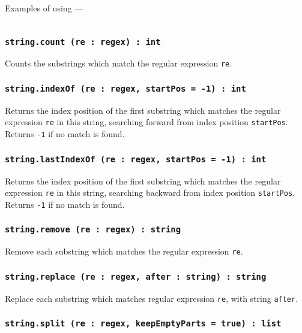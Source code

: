 Examples of using —
\inputminted[linenos]{icl}{../sources/regexplikearg.icL}

\subsubsection{\texttt{string.count (re : regex) : int}}

Counts the substrings which match the regular expression \texttt{re}.

\subsubsection{\texttt{string.indexOf (re : regex, startPos = -1) : int}}

Returns the index position of the first substring which matches the regular expression \texttt{re} in this string, searching forward from index position \texttt{startPos}. Returns \texttt{-1} if no match is found.

\subsubsection{\texttt{string.lastIndexOf (re : regex, startPos = -1) : int}}

Returns the index position of the first substring which matches the regular expression \texttt{re} in this string, searching backward from index position \texttt{startPos}. Returns \texttt{-1} if no match is found.

\subsubsection{\texttt{string.remove (re : regex) : string}}

Remove each substring which matches the regular expression \texttt{re}.

\subsubsection{\texttt{string.replace (re : regex, after : string) : string}}

Replace each substring which matches regular expression \texttt{re}, with string \texttt{after}.

\subsubsection{\texttt{string.split (re : regex, keepEmptyParts = true) : list}}

